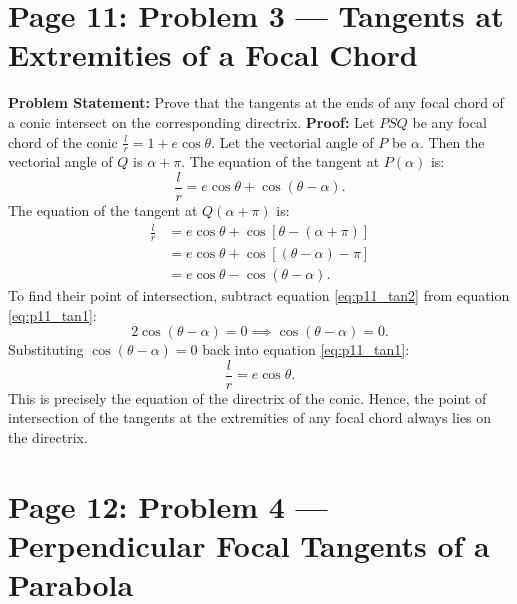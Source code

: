\newpage
\section{Page 11: Problem 3 --- Tangents at Extremities of a Focal Chord}
\label{sec:page11}

\begin{examplebox}
\textbf{Problem Statement:}
Prove that the tangents at the ends of any focal chord of a conic intersect on the corresponding directrix.
\tcblower
\textbf{Proof:}
Let $PSQ$ be any focal chord of the conic $\frac{l}{r} = 1 + e\cos\theta$.
Let the vectorial angle of $P$ be $\alpha$. Then the vectorial angle of $Q$ is $\alpha + \pi$.
The equation of the tangent at $P(\alpha)$ is:
\begin{equation}
    \frac{l}{r} = e\cos\theta + \cos(\theta - \alpha). \label{eq:p11_tan1}
\end{equation}
The equation of the tangent at $Q(\alpha + \pi)$ is:
\begin{align}
    \frac{l}{r} &= e\cos\theta + \cos[\theta - (\alpha + \pi)] \nonumber\\
                &= e\cos\theta + \cos[(\theta - \alpha) - \pi] \nonumber\\
                &= e\cos\theta - \cos(\theta - \alpha). \label{eq:p11_tan2}
\end{align}
To find their point of intersection, subtract equation \eqref{eq:p11_tan2} from equation \eqref{eq:p11_tan1}:
\begin{equation}
    2\cos(\theta - \alpha) = 0 \implies \cos(\theta - \alpha) = 0.
\end{equation}
Substituting $\cos(\theta - \alpha) = 0$ back into equation \eqref{eq:p11_tan1}:
\begin{equation}
    \frac{l}{r} = e\cos\theta.
\end{equation}
This is precisely the equation of the directrix of the conic.
Hence, the point of intersection of the tangents at the extremities of any focal chord always lies on the directrix.
\end{examplebox}

\newpage
\section{Page 12: Problem 4 --- Perpendicular Focal Tangents of a Parabola}
\label{sec:page12}

